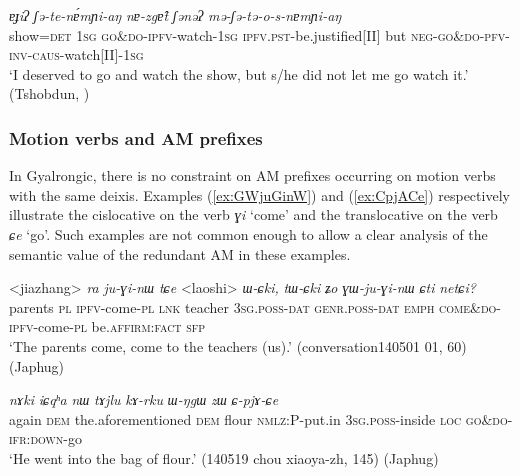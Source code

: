 \documentclass[oneside,a4paper,11pt]{article}
\newcommand{\ipa}[1]{{\phon\textit{#1}}}
\newcommand{\japhug}[2]{\textit{\phon#1} `#2'}
\newcommand{\sens}[1]{‘#1’}
\newcommand{\rouge}[1]{{\color{red}#1}}
\begin{document}
\begin{exe}
\ex \label{ex:mESEtosnAmYiaN}
\gll \ipa{tʃone=nəʔ}	\ipa{ɐɟiʔ}	\ipa{\rouge{ʃə}-te-nɐ́mɲi-aŋ}	\ipa{nɐ-zgɐ̂t}	\ipa{ʃənəʔ}	\ipa{mə-\rouge{ʃə}-tə-o-s-nɐmɲi-aŋ} \\
 show=\textsc{det} \textsc{1sg} \rouge{\textsc{go\&do}}-\textsc{ipfv}-watch-\textsc{1sg} \textsc{ipfv}.\textsc{pst}-be.justified[II] but \textsc{neg}-\rouge{\textsc{go\&do}}-\textsc{pfv}-\textsc{inv}-\textsc{caus}-watch[II]-\textsc{1sg} \\
\glt  \sens{I deserved to go and watch the show, but s/he did not let me go watch it.} (Tshobdun, \citealt[478]{sun12complementation})
  \end{exe} 
 

\subsubsection{Motion verbs and AM prefixes}
In Gyalrongic, there is no constraint on AM prefixes occurring on motion verbs with the same deixis. Examples (\ref{ex:GWjuGinW}) and (\ref{ex:CpjACe}) respectively illustrate the cislocative on the verb \japhug{ɣi}{come} and the translocative on the verb \japhug{ɕe}{go}. Such examples are not common enough to allow a clear analysis of the semantic value of the redundant AM in these examples.

\begin{exe}
\ex \label{ex:GWjuGinW}
 \gll <jiazhang> \ipa{ra}	\ipa{ju-ɣi-nɯ}	\ipa{tɕe}  <laoshi> \ipa{ɯ-ɕki,}	\ipa{tɯ-ɕki}	\ipa{ʑo}	\ipa{\rouge{ɣɯ}-ju-ɣi-nɯ}	\ipa{ɕti}	\ipa{netɕi?}  \\
 parents \textsc{pl} \textsc{ipfv}-come-\textsc{pl} \textsc{lnk} teacher \textsc{3sg}.\textsc{poss}-\textsc{dat} \textsc{genr}.\textsc{poss}-\textsc{dat} \textsc{emph} \rouge{\textsc{come\&do}}-\textsc{ipfv}-come-\textsc{pl} be.\textsc{affirm}:\textsc{fact} \textsc{sfp} \\
 \glt `The parents come, come to the teachers (us).' (conversation140501 01, 60) (Japhug)
\end{exe}

\begin{exe}
\ex \label{ex:CpjACe}
 \gll \ipa{li}	\ipa{nɤki}	\ipa{iɕqʰa}	\ipa{nɯ}	\ipa{tɤjlu}	\ipa{kɤ-rku}	\ipa{ɯ-ŋgɯ}	\ipa{zɯ}	\ipa{\rouge{ɕ}-pjɤ-ɕe} \\
 again \textsc{dem} the.aforementioned \textsc{dem} flour \textsc{nmlz}:P-put.in \textsc{3sg}.\textsc{poss}-inside \textsc{loc} \rouge{\textsc{go\&do}}-\textsc{ifr}:\textsc{down}-go \\
 \glt `He went into the bag of flour.' (140519 chou xiaoya-zh, 145) (Japhug)
\end{exe}
\end{document}

